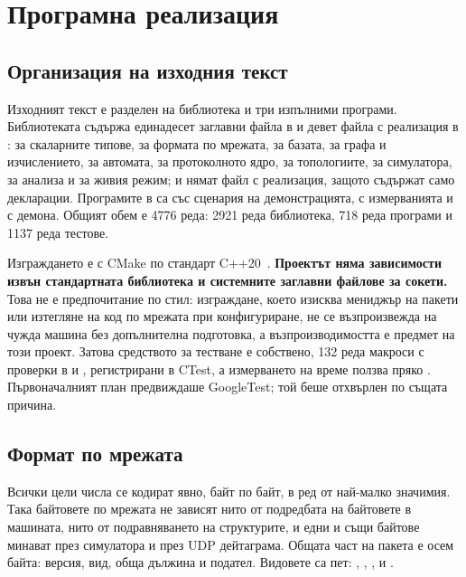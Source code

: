 \section{Програмна реализация}
\label{sec:implementation}

\subsection{Организация на изходния текст}

Изходният текст е разделен на библиотека и три изпълними програми. Библиотеката съдържа
единадесет заглавни файла в  и девет файла с
реализация в :
 за скаларните типове,  за формата по мрежата,  за
базата,  за графа и изчислението,  за автомата,  за
протоколното ядро,  за топологиите,  за симулатора,
 за анализа и  за живия режим;  и
 нямат файл с реализация, защото съдържат само декларации. Програмите в  са
 със сценария на демонстрацията,  с
измерванията и  с демона. Общият обем е 4776 реда: 2921 реда
библиотека, 718 реда програми и 1137 реда тестове.

Изграждането е с CMake по стандарт C++20~\cite{iso_cpp20}. \textbf{Проектът няма
зависимости извън стандартната библиотека и системните заглавни файлове за сокети.} Това
не е предпочитание по стил: изграждане, което изисква мениджър на пакети или изтегляне на
код по мрежата при конфигуриране, не се възпроизвежда на чужда машина без допълнителна
подготовка, а възпроизводимостта е предмет на този проект. Затова средството за тестване
е собствено, 132 реда макроси с проверки в  и ,
регистрирани в CTest, а измерването на време ползва пряко .
Първоначалният план предвиждаше GoogleTest; той беше отхвърлен по същата причина.

\subsection{Формат по мрежата}

Всички цели числа се кодират явно, байт по байт, в ред от най-малко значимия. Така
байтовете по мрежата не зависят нито от подредбата на байтовете в машината, нито от
подравняването на структурите, и едни и същи байтове минават през симулатора и през UDP
дейтаграма. Общата част на пакета е осем байта: версия, вид, обща дължина и подател.
Видовете са пет: , , ,  и
.

